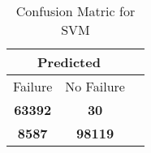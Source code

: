\begin{table}[] 
\caption{Confusion Matric for SVM} 
\label{Table: Prediction Accuracy-NoneSVMSVMEKF-ignoresolarPanelDipole-solarPanelDipole} 
\centering 
\begin{tabular} 
 {@{}ccc@{}} 
\toprule 
\multicolumn{2}{c}{\textbf{Predicted}}
 \\ \midrule 
\multicolumn{1}{|c|}{Failure} & 
\multicolumn{1}{c|}{No Failure}
 \\ \midrule 
\multicolumn{1}{|c|}{\color{green}\textbf{63392}} & 
\multicolumn{1}{c|}{\color{red}\textbf{30}}
 \\ \midrule 
\multicolumn{1}{|c|}{\color{red}\textbf{8587}} & 
\multicolumn{1}{c|}{\color{green}\textbf{98119}}
 \\ \bottomrule 
\end{tabular} 
\end{table} 
